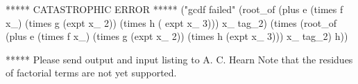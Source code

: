 ***** CATASTROPHIC ERROR *****
("gcdf failed" (root_of (plus e (times f x_) (times g (expt x_ 2)) (times h (
expt x_ 3))) x_ tag_2) (times (root_of (plus e (times f x_) (times g (expt
x_ 2)) (times h (expt x_ 3))) x_ tag_2) h))



***** Please send output and input listing to A. C. Hearn
\fi
Note that the residues of factorial terms are
not yet supported.
